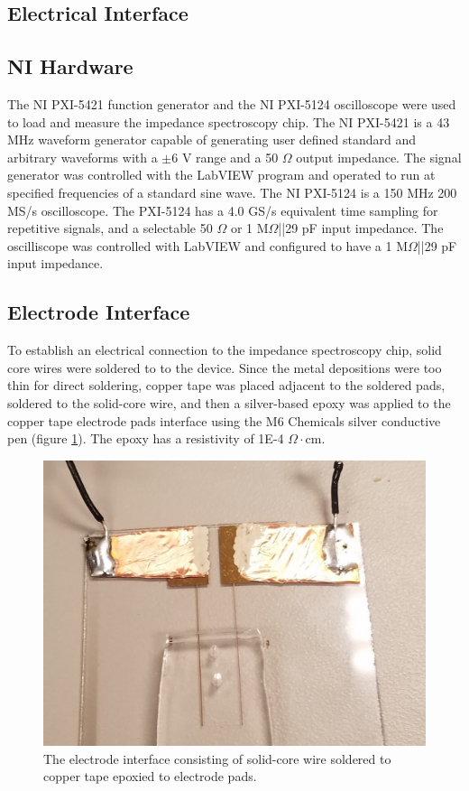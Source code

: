 \subsection{Electrical Interface}

\subsection*{NI Hardware}
\par The NI PXI-5421 function generator and the NI PXI-5124 oscilloscope were used to load and measure the impedance spectroscopy chip. The NI PXI-5421 is a 43 MHz waveform generator capable of generating user defined standard and arbitrary waveforms with a $\pm$6 V range and a 50 $\Omega$ output impedance. The signal generator was controlled with the LabVIEW program and operated to run at specified frequencies of a standard sine wave. The NI PXI-5124 is a 150 MHz 200 MS/s oscilloscope. The PXI-5124 has a 4.0 GS/s equivalent time sampling for repetitive signals, and a selectable 50 $\Omega$ or 1 M$\Omega$||29 pF input impedance. The oscilliscope was controlled with LabVIEW and configured to have a 1 M$\Omega$||29 pF input impedance.

\subsection*{Electrode Interface}
\par To establish an electrical connection to the impedance spectroscopy chip, solid core wires were soldered to to the device. Since the metal depositions were too thin for direct soldering, copper tape was placed adjacent to the soldered pads, soldered to the solid-core wire, and then a silver-based epoxy was applied to the copper tape electrode pads interface using the M6 Chemicals silver conductive pen (figure \ref{fig:electrode_interface}). The epoxy has a resistivity of 1E-4 $\Omega\cdot$cm.

\begin{figure}[h]
    \centering
    \includegraphics[width=\textwidth]{images/electrod_interface.jpg}
    \caption[Electrode interface]{The electrode interface consisting of solid-core wire soldered to copper tape epoxied to electrode pads.}
    \label{fig:electrode_interface}
\end{figure}

